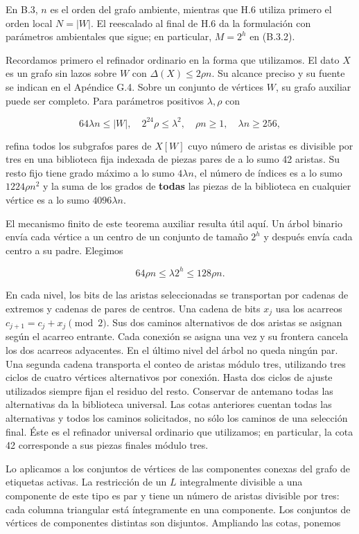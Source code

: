 \documentclass[spanish,11pt,a4paper]{article}
\begin{document}
En B.3, \(n\) es el orden del grafo ambiente, mientras que H.6 utiliza primero el orden local \(N=|W|\). El reescalado al final de H.6 da la formulación con parámetros ambientales que sigue; en particular, \(M=2^h\) en (B.3.2).

Recordamos primero el refinador ordinario en la forma que utilizamos. El dato \(X\) es un grafo sin lazos sobre \(W\) con \(\Delta(X)\le2\rho n\). Su alcance preciso y su fuente se indican en el Apéndice G.4. Sobre un conjunto de vértices \(W\), su grafo auxiliar puede ser completo. Para parámetros positivos \(\lambda,\rho\) con

\[64\lambda n\le |W|,\quad 2^{24}\rho\le\lambda^2,
\quad \rho n\ge1,\quad\lambda n\ge256,
\tag{B.3.1}\]

refina todos los subgrafos pares de \(X[W]\) cuyo número de aristas es divisible por tres en una biblioteca fija indexada de piezas pares de a lo sumo 42 aristas. Su resto fijo tiene grado máximo a lo sumo \(4\lambda n\), el número de índices es a lo sumo \(1224\rho n^2\) y la suma de los grados de \textbf{todas} las piezas de la biblioteca en cualquier vértice es a lo sumo \(4096\lambda n\).

El mecanismo finito de este teorema auxiliar resulta útil aquí. Un árbol binario envía cada vértice a un centro de un conjunto de tamaño \(2^h\) y después envía cada centro a su padre. Elegimos

\[64\rho n\le\lambda2^h\le128\rho n.
\tag{B.3.2}\]

En cada nivel, los bits de las aristas seleccionadas se transportan por cadenas de extremos y cadenas de pares de centros. Una cadena de bits \(x_j\) usa los acarreos \(c_{j+1}=c_j+x_j\pmod2\). Sus dos caminos alternativos de dos aristas se asignan según el acarreo entrante. Cada conexión se asigna una vez y su frontera cancela los dos acarreos adyacentes. En el último nivel del árbol no queda ningún par. Una segunda cadena transporta el conteo de aristas módulo tres, utilizando tres ciclos de cuatro vértices alternativos por conexión. Hasta dos ciclos de ajuste utilizados siempre fijan el residuo del resto. Conservar de antemano todas las alternativas da la biblioteca universal. Las cotas anteriores cuentan todas las alternativas y todos los caminos solicitados, no sólo los caminos de una selección final. Éste es el refinador universal ordinario que utilizamos; en particular, la cota 42 corresponde a sus piezas finales módulo tres.

Lo aplicamos a los conjuntos de vértices de las componentes conexas del grafo de etiquetas activas. La restricción de un \(L\) integralmente divisible a una componente de este tipo es par y tiene un número de aristas divisible por tres: cada columna triangular está íntegramente en una componente. Los conjuntos de vértices de componentes distintas son disjuntos. Ampliando las cotas, ponemos
\end{document}
